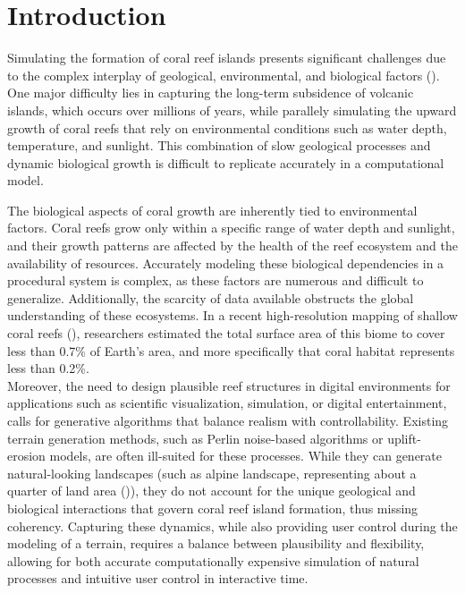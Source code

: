 \section{Introduction}

Simulating the formation of coral reef islands presents significant challenges due to the complex interplay of geological, environmental, and biological factors (\cite{Hopley2014}). One major difficulty lies in capturing the long-term subsidence of volcanic islands, which occurs over millions of years, while parallely simulating the upward growth of coral reefs that rely on environmental conditions such as water depth, temperature, and sunlight. This combination of slow geological processes and dynamic biological growth is difficult to replicate accurately in a computational model.

The biological aspects of coral growth are inherently tied to environmental factors. Coral reefs grow only within a specific range of water depth and sunlight, and their growth patterns are affected by the health of the reef ecosystem and the availability of resources. Accurately modeling these biological dependencies in a procedural system is complex, as these factors are numerous and difficult to generalize. Additionally, the scarcity of data available obstructs the global understanding of these ecosystems. In a recent high-resolution mapping of shallow coral reefs (\cite{Lyons2024}), researchers estimated the total surface area of this biome to cover less than 0.7\% of Earth's area, and more specifically that coral habitat represents less than 0.2\%.  \\
\indent Moreover, the need to design plausible reef structures in digital environments for applications such as scientific visualization, simulation, or digital entertainment, calls for generative algorithms that balance realism with controllability. Existing terrain generation methods, such as Perlin noise-based algorithms or uplift-erosion models, are often ill-suited for these processes. While they can generate natural-looking landscapes (such as alpine landscape, representing about a quarter of land area (\cite{Korner2014})), they do not account for the unique geological and biological interactions that govern coral reef island formation, thus missing coherency. Capturing these dynamics, while also providing user control during the modeling of a terrain, requires a balance between plausibility and flexibility, allowing for both accurate computationally expensive simulation of natural processes and intuitive user control in interactive time.


